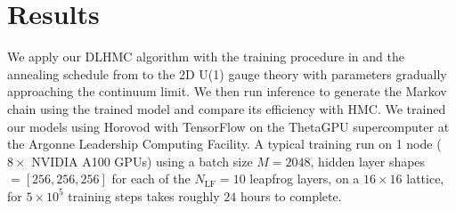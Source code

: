 \documentclass{article} %
\begin{document}
\section{\label{sec:results}Results}
%
We apply our DLHMC algorithm with
the training procedure in  and the annealing schedule from 
to the 2D U(1) gauge theory with parameters gradually approaching the continuum limit.
We then run inference to generate the Markov chain using the trained model and compare its efficiency with HMC.
%
%
We trained our models using Horovod \citep{horovod2018sergeev} with TensorFlow \citep{tensorflow2015-whitepaper} on the ThetaGPU supercomputer at the Argonne Leadership Computing Facility.
%
%
A typical training run on 1 node (\(8\times\) NVIDIA A100 GPUs) using a batch size \(M=2048\), hidden layer shapes \(=\left[256, 256, 256\right]\) for each of the \(N_{\mathrm{LF}}=10\) leapfrog layers, on a \(16\times16\) lattice, for \(5\times10^{5}\) training steps takes roughly \(24\) hours to complete.
%
%

%

%
\end{document}
